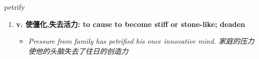 
\begin{frame}
{\huge petrify}
\begin{center}
\begin{enumerate}\Large
  \item \textbf{v. 使僵化,失去活力: to cause to become stiff or stone-like; deaden}
  \begin{itemize}
    \item \em{\Large{Pressure from family has petrified his once innovative mind. 家庭的压力使他的头脑失去了往日的创造力}}
  \end{itemize}
\end{enumerate}
\end{center}
\end{frame}
